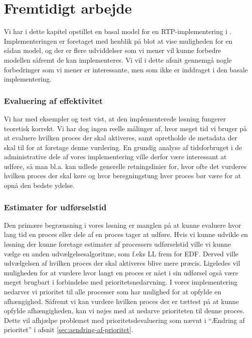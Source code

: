 \section{Fremtidigt arbejde}\label{sec:deadlineFuture}
Vi har i dette kapitel opstillet en basal model for en RTP-implementering i \pycsp. Implementeringen er foretaget med henblik på blot at vise muligheden for en sådan model, og der er flere udviddelser som vi mener vil kunne forbedre modellen såfremt de kan implementeres. Vi vil i dette afsnit gennemgå nogle forbedringer som vi mener er interessante, men som ikke er inddraget i den basale implementering. 

\subsubsection{Evaluering af effektivitet}
Vi har med eksempler og test vist, at den implementerede løsning fungerer teoretisk korrekt. Vi har dog ingen reelle målinger af, hvor meget tid vi bruger på at evaluere hvilken proces der skal aktiveres, samt opretholde de metadata der skal til for at foretage denne vurdering. En grundig analyse af tidsforbruget i de administrative dele af vores implementering ville derfor være interessant at udføre, så man bl.a. kan udlede generelle retningslinier for, hvor ofte det vurderes hvilken proces der skal køre og hvor beregningstung hver proces bør være for at opnå den bedste ydelse. 

\subsubsection{Estimater for udførselstid}
Den primære begrænsning i vores løsning er manglen på at kunne evaluere hvor lang tid en proces eller dele af en proces tager at udføre. Hvis vi kunne udvikle en løsning der kunne foretage estimater af processers udførselstid ville vi kunne vælge en anden udvælgelsesalgoritme, som f.eks LL frem for EDF. Derved ville udvælgelsen af hvilken proces der skal aktiveres blive mere præcis. Ligeledes vil muligheden for at vurdere hvor langt en proces er nået i sin udførsel også være meget brugbart i forbindelse med prioritetsnedarvning. I vores implementering nedarver vi prioritet til alle processer som har mulighed for at opfylde en afhængighed. Såfremt vi kan vurdere hvilken proces der er tættest på at kunne opfylde afhængigheden, kan vi nøjes med at nedarve prioriteten til denne proces. Dette vil afhjælpe problemet med prioritetsdevaluering som nævnt i ``Ændring af prioritet'' i afsnit \ref{sec:aendring-af-prioritet}.

